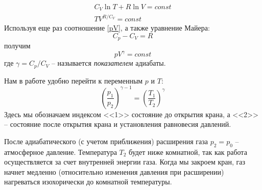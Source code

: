 \documentclass[a4paper,12pt]{article}
\begin{document}
        \begin{eqnarray}
            C_V\ln T+R\ln V=const\\ 
            TV^{R/C_V}=const
        \end{eqnarray}
        Используя еще раз соотношение \eqref{pV}, а также уравнение Майера:
        \begin{equation}
            \label{Mayer}
            C_p-C_V=R
        \end{equation}
        получим
        \begin{equation}
            \label{final gamma}
            pV^\gamma=const
        \end{equation}
        где $\gamma=C_p/C_V$ -- называется \emph{показателем} адиабаты.

        Нам в работе удобно перейти к переменным $p$ и $T$:
        \begin{equation}
            \label{pT-final}
            \left( \frac{p_1}{p_2} \right)^{\gamma-1}=\left( \frac{T_1}{T_2} \right)^\gamma
        \end{equation}
        Здесь мы обозначаем индексом <<1>> состояние до открытия крана, а <<2>> -- состояние после открытия крана и установления равновесия давлений. 
        
        После адиабатического (с учетом приближения) расширения газа $p_2=p_0$ -- атмосферное давление. Температура $T_2$ будет ниже комнатной, так как работа осуществляется за счет внутренней энергии газа. Когда мы закроем кран, газ начнет медленно (относительно изменения давления при расширении) нагреваться изохорически до комнатной температуры.
        
\end{document}
